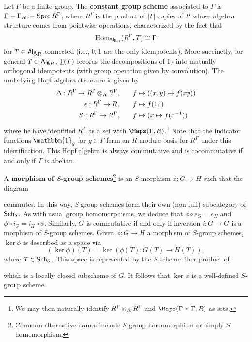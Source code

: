 \documentclass[11pt]{article}
\newcommand{\ind}{\mathbbm{1}}
\begin{document}
\begin{example}
\begin{enum}{\arabic}
\item Let $\Gamma$ be a finite group. The \textbf{constant group scheme} associated to $\Gamma$ is $\underline{\Gamma}=\Gamma_R:=\operatorname{Spec} R^{\Gamma}$, where $R^{\Gamma}$ is the product of $|\Gamma|$ copies of $R$ whose algebra structure comes from pointwise operations, characterized by the fact that 
$$\operatorname{Hom}_{\operatorname{\mathsf{Alg}}_R}(R^{\Gamma},T)\cong\Gamma$$
for $T\in\operatorname{\mathsf{Alg}}_R$ connected (i.e., $0,1$ are the only idempotents). More succinctly, for general $T\in\operatorname{\mathsf{Alg}}_R$, $\underline{\Gamma}(T)$ records the decompositions of $1_T$ into mutually orthogonal idempotents (with group operation given by convolution). The underlying Hopf algebra structure is given by 
\begin{align*}
\Delta: R^{\Gamma}\to R^{\Gamma}\otimes_RR^{\Gamma}, \qquad &f\mapsto((x,y)\mapsto f(xy)) \\
\epsilon: R^{\Gamma}\to R, \qquad &f\mapsto f(1_{\Gamma}) \\
S: R^{\Gamma}\to R^{\Gamma}, \qquad &f\mapsto(x\mapsto f(x^{-1}))
\end{align*}
where he have identified $R^{\Gamma}$ as a set with $\Maps(\Gamma,R)$.\footnote{We may then naturally identify $R^{\Gamma}\otimes_RR^{\Gamma}$ and $\Maps(\Gamma\times\Gamma,R)$ as sets.} Note that the indicator functions $\ind_g$ for $g\in\Gamma$ form an $R$-module basis for $R^{\Gamma}$ under this identification. This Hopf algebra is always commutative and is cocommutative if and only if $\Gamma$ is abelian.
\end{enum}
\end{example}

A \textbf{morphism of $S$-group schemes}\footnote{Common alternative names include $S$-group homomorphism or simply $S$-homomorphism.} is an $S$-morphism $\phi: G\to H$ such that the diagram
\begin{center}
\end{center}
commutes. In this way, $S$-group schemes form their own (non-full) subcategory of $\operatorname{\mathsf{Sch}}_S$. As with usual group homomorphisms, we deduce that $\phi\circ e_G=e_H$ and $\phi\circ i_G=i_H\circ\phi$. Similarly, $G$ is commutative if and only if inversion $i: G\to G$ is a morphism of $S$-group schemes. Given $\phi: G\to H$ a morphism of $S$-group schemes, $\ker\phi$ is described as a space via
$$(\ker\phi)(T)=\ker(\phi(T): G(T)\to H(T)),$$
where $T\in\operatorname{\mathsf{Sch}}_S$. This space is represented by the $S$-scheme fiber product of 
\begin{center}
\end{center}
which is a locally closed subscheme of $G$. It follows that $\ker\phi$ is a well-defined $S$-group scheme. 
\end{document}
